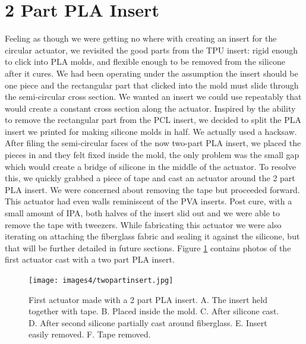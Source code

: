 \section{2 Part PLA Insert}
Feeling as though we were getting no where with creating an insert for the circular actuator, we revisited the good parts from the TPU insert: rigid enough to click into PLA molds, and flexible enough to be removed from the silicone after it cures. We had been operating under the assumption the insert should be one piece and the rectangular part that clicked into the mold must slide through the semi-circular cross section. We wanted an insert we could use repeatably that would create a constant cross section along the actuator. Inspired by the ability to remove the rectangular part from the PCL insert, we decided to split the PLA insert we printed for making silicone molds in half. We actually used a hacksaw. After filing the semi-circular faces of the now two-part PLA insert, we placed the pieces in and they felt fixed inside the mold, the only problem was the small gap which would create a bridge of silicone in the middle of the actuator. To resolve this, we quickly grabbed a piece of tape and cast an actuator around the 2 part PLA insert. We were concerned about removing the tape but proceeded forward. This actuator had even walls reminiscent of the PVA inserts. Post cure, with a small amount of IPA, both halves of the insert slid out and we were able to remove the tape with tweezers. While fabricating this actuator we were also iterating on attaching the fiberglass fabric and sealing it against the silicone, but that will be further detailed in future sections. Figure \ref{fig:twopartinsert} contains photos of the first actuator cast with a two part PLA insert. 

\begin{figure}[h]
    \centering
    \texttt{[image: images4/twopartinsert.jpg]}
    \caption{First actuator made with a 2 part PLA insert. A. The insert held together with tape. B. Placed inside the mold. C. After silicone cast. D. After second silicone partially cast around fiberglass. E. Insert easily removed. F. Tape removed.}
    \label{fig:twopartinsert}
\end{figure}

